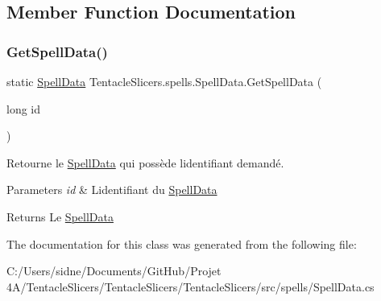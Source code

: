 \subsection{Member Function Documentation}
\mbox{\label{class_tentacle_slicers_1_1spells_1_1_spell_data_a15f445cba6452dea32e963b683873f27}} 
\subsubsection{\texorpdfstring{Get\+Spell\+Data()}{GetSpellData()}}
{\footnotesize\ttfamily static \hyperlink{class_tentacle_slicers_1_1spells_1_1_spell_data}{Spell\+Data} Tentacle\+Slicers.\+spells.\+Spell\+Data.\+Get\+Spell\+Data (\begin{DoxyParamCaption}\item[{long}]{id }\end{DoxyParamCaption})\hspace{0.3cm}{\ttfamily [static]}}



Retourne le \hyperlink{class_tentacle_slicers_1_1spells_1_1_spell_data}{Spell\+Data} qui possède l\textquotesingle{}identifiant demandé. 


\begin{DoxyParams}{Parameters}
{\em id} & L\textquotesingle{}identifiant du \hyperlink{class_tentacle_slicers_1_1spells_1_1_spell_data}{Spell\+Data} \\
\hline
\end{DoxyParams}
\begin{DoxyReturn}{Returns}
Le \hyperlink{class_tentacle_slicers_1_1spells_1_1_spell_data}{Spell\+Data} 
\end{DoxyReturn}


The documentation for this class was generated from the following file\+:\begin{DoxyCompactItemize}
\item 
C\+:/\+Users/sidne/\+Documents/\+Git\+Hub/\+Projet 4\+A/\+Tentacle\+Slicers/\+Tentacle\+Slicers/\+Tentacle\+Slicers/src/spells/Spell\+Data.\+cs\end{DoxyCompactItemize}
